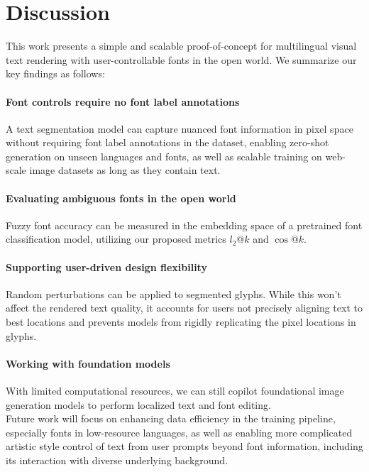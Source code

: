 \section{Discussion}
This work presents a simple and scalable proof-of-concept for multilingual visual text rendering with user-controllable fonts in the open world. We summarize our key findings as follows:

\paragraph{Font controls require no font label annotations} 
A text segmentation model can capture nuanced font information in pixel space without requiring font label annotations in the dataset, enabling zero-shot generation on unseen languages and fonts, as well as scalable training on web-scale image datasets as long as they contain text.

\paragraph{Evaluating ambiguous fonts in the open world} 
Fuzzy font accuracy can be measured in the embedding space of a pretrained font classification model, utilizing our proposed metrics $l_2@k$ and $\cos@k$.

\paragraph{Supporting user-driven design flexibility} 
Random perturbations can be applied to segmented glyphs. While this won’t affect the rendered text quality, it accounts for users not precisely aligning text to best locations and prevents models from rigidly replicating the pixel locations in glyphs.

\paragraph{Working with foundation models} 
With limited computational resources, we can still copilot foundational image generation models to perform localized text and font editing.
\\

Future work will focus on enhancing data efficiency in the training pipeline, especially fonts in low-resource languages, as well as enabling more complicated artistic style control of text from user prompts beyond font information, including its interaction with diverse underlying background. 